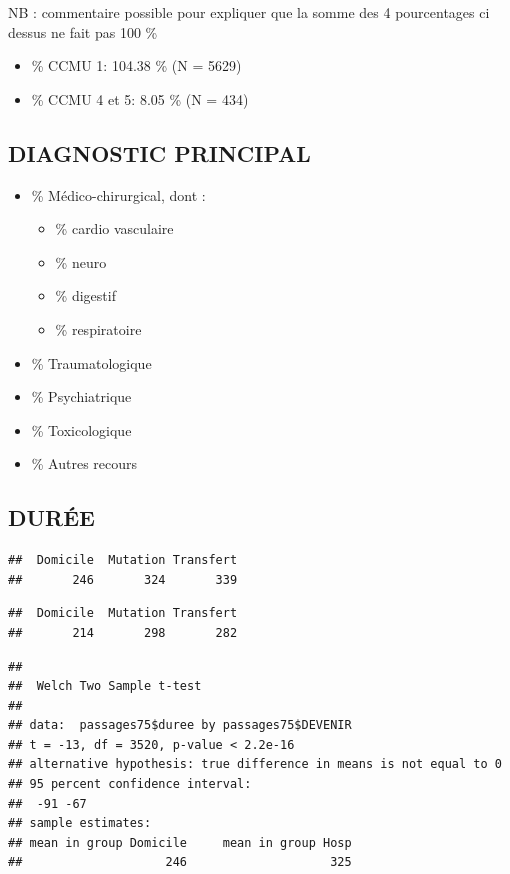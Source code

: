 \documentclass[]{article}
\begin{document}
NB : commentaire possible pour expliquer que la somme des 4 pourcentages
ci dessus ne fait pas 100 \%

\begin{itemize}
\itemsep1pt\parskip0pt
\item
  \% CCMU 1: 104.38 \% (N = 5629)
\item
  \% CCMU 4 et 5: 8.05 \% (N = 434)
\end{itemize}

\subsection{DIAGNOSTIC PRINCIPAL}\label{diagnostic-principal}

\begin{itemize}
\itemsep1pt\parskip0pt
\item
  \% Médico-chirurgical, dont :

  \begin{itemize}
  \itemsep1pt\parskip0pt
  \item
    \% cardio vasculaire
  \item
    \% neuro
  \item
    \% digestif
  \item
    \% respiratoire
  \end{itemize}
\item
  \% Traumatologique
\item
  \% Psychiatrique
\item
  \% Toxicologique
\item
  \% Autres recours
\end{itemize}

\subsection{DURÉE}\label{duree}

\begin{verbatim}
##  Domicile  Mutation Transfert 
##       246       324       339
\end{verbatim}

\begin{verbatim}
##  Domicile  Mutation Transfert 
##       214       298       282
\end{verbatim}

\begin{verbatim}
## 
##  Welch Two Sample t-test
## 
## data:  passages75$duree by passages75$DEVENIR
## t = -13, df = 3520, p-value < 2.2e-16
## alternative hypothesis: true difference in means is not equal to 0
## 95 percent confidence interval:
##  -91 -67
## sample estimates:
## mean in group Domicile     mean in group Hosp 
##                    246                    325
\end{verbatim}
\end{document}
